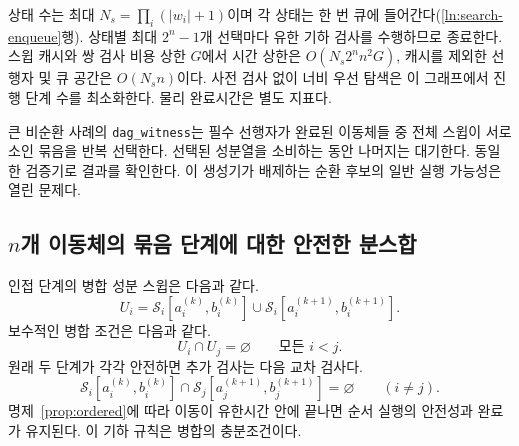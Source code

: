 \documentclass[11pt,a4paper]{article}
\theoremstyle{remark}
\newcommand{\Sw}{\mathcal S}
\begin{document}
상태 수는 최대 $N_s=\prod_i(|w_i|+1)$이며 각 상태는 한 번 큐에 들어간다(\ref{ln:search-enqueue}행). 상태별 최대 $2^n-1$개 선택마다 유한 기하 검사를 수행하므로 종료한다. 스윕 캐시와 쌍 검사 비용 상한 $G$에서 시간 상한은 $O(N_s2^n n^2G)$, 캐시를 제외한 선행자 및 큐 공간은 $O(N_s n)$이다. 사전 검사 없이 너비 우선 탐색은 이 그래프에서 진행 단계 수를 최소화한다. 물리 완료시간은 별도 지표다.

큰 비순환 사례의 \texttt{dag\_witness}는 필수 선행자가 완료된 이동체들 중 전체 스윕이 서로소인 묶음을 반복 선택한다. 선택된 성분열을 소비하는 동안 나머지는 대기한다. 동일한 검증기로 결과를 확인한다. 이 생성기가 배제하는 순환 후보의 일반 실행 가능성은 열린 문제다.

\subsection{$n$개 이동체의 묶음 단계에 대한 안전한 분스합}
인접 단계의 병합 성분 스윕은 다음과 같다.
\begin{equation}
 U_i=\Sw_i[a_i^{(k)},b_i^{(k)}]\cup
     \Sw_i[a_i^{(k+1)},b_i^{(k+1)}].
 \label{eq:merged-union}
\end{equation}
보수적인 병합 조건은 다음과 같다.
\begin{equation}
 U_i\cap U_j=\varnothing\qquad\text{모든 }i<j.
 \label{eq:merge-safe}
\end{equation}
원래 두 단계가 각각 안전하면 추가 검사는 다음 교차 검사다.
\begin{equation}
 \Sw_i[a_i^{(k)},b_i^{(k)}]\cap
 \Sw_j[a_j^{(k+1)},b_j^{(k+1)}]=\varnothing\qquad(i\ne j).
 \label{eq:merge-cross}
\end{equation}
명제~\ref{prop:ordered}에 따라 이동이 유한시간 안에 끝나면 순서 실행의 안전성과 완료가 유지된다. 이 기하 규칙은 병합의 충분조건이다.
\end{document}
